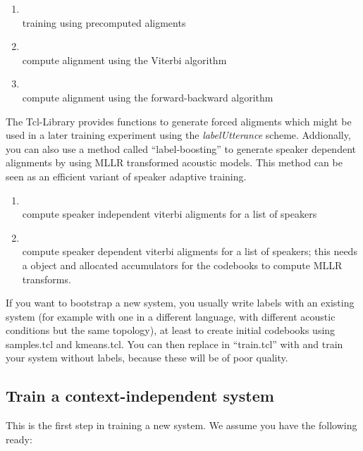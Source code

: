 \begin{enumerate}
\item {} \\
training using precomputed aligments
\item {} \\
compute alignment using the Viterbi algorithm
\item {} \\
compute alignment using the forward-backward algorithm
\end{enumerate}

The Tcl-Library provides functions  to generate forced aligments which
might  be  used  in   a later   training  experiment   using the  {\em
labelUtterance} scheme.  Addionally, you can  also use a method called
``label-boosting'' to generate speaker  dependent alignments by  using
MLLR  transformed acoustic models.   This  method can  be  seen as  an
efficient variant of speaker adaptive training.

\begin{enumerate}
\item {} \\
  compute speaker independent viterbi aligments for a list of speakers
\item {} \\
  compute speaker dependent viterbi aligments for a list of speakers; this needs
  a  object and allocated accumulators for the codebooks to
  compute MLLR transforms.
\end{enumerate}

If you want to  bootstrap a new  system, you usually write labels with
an existing system (for example with one in a different language, with
different acoustic  conditions  but  the same topology),  at  least to
create initial codebooks using samples.tcl   and kmeans.tcl.  You  can
then   replace      in  ``train.tcl''  with
  and train  your system without  labels,
because these will be of poor quality.

\subsection{Train a context-independent system} \label{janus:ci}

This is the first step in training a new system. We assume you have
the following ready:

